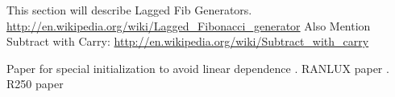 This section will describe Lagged Fib Generators.
\url{http://en.wikipedia.org/wiki/Lagged_Fibonacci_generator}
Also Mention Subtract with Carry:
\url{http://en.wikipedia.org/wiki/Subtract_with_carry}

Paper for special initialization to avoid linear dependence \cite{Matsumoto:2007:CDI:1276927.1276928}.
RANLUX paper \cite{luscher1994portable}.
R250 paper \cite{kirkpatrick1981very}

